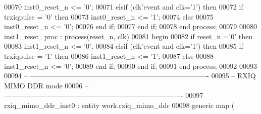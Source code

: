 \begin{DoxyCode}
00070       inst0\_reset\_n <= '0';
00071    \textcolor{keywordflow}{elsif} \textcolor{vhdlchar}{(}\textcolor{vhdlchar}{clk}\textcolor{vhdlchar}{'}\textcolor{vhdlkeyword}{event} \textcolor{keywordflow}{and} \textcolor{vhdlchar}{clk}\textcolor{vhdlchar}{=}\textcolor{vhdlchar}{'}\textcolor{vhdllogic}{}\textcolor{vhdllogic}{1}\textcolor{vhdlchar}{'}\textcolor{vhdlchar}{)} \textcolor{keywordflow}{then} 
00072       \textcolor{keywordflow}{if} \textcolor{vhdlchar}{trxiqpulse} \textcolor{vhdlchar}{=} \textcolor{vhdlchar}{'}\textcolor{vhdllogic}{}\textcolor{vhdllogic}{0}\textcolor{vhdlchar}{'} \textcolor{keywordflow}{then} 
00073          inst0\_reset\_n <= '1';
00074       \textcolor{keywordflow}{else} 
00075          inst0\_reset\_n <= '0';
00076       \textcolor{keywordflow}{end} \textcolor{keywordflow}{if};
00077    \textcolor{keywordflow}{end} \textcolor{keywordflow}{if};
00078 \textcolor{keywordflow}{end} \textcolor{keywordflow}{process};
00079 
00080 inst1\_reset\_proc : \textcolor{keywordflow}{process}(reset_n, clk)
00081 \textcolor{vhdlkeyword}{begin}
00082    \textcolor{keywordflow}{if} \textcolor{vhdlchar}{reset_n} \textcolor{vhdlchar}{=}\textcolor{vhdlchar}{'}\textcolor{vhdllogic}{}\textcolor{vhdllogic}{0}\textcolor{vhdlchar}{'} \textcolor{keywordflow}{then} 
00083       inst1\_reset\_n <= '0';
00084    \textcolor{keywordflow}{elsif} \textcolor{vhdlchar}{(}\textcolor{vhdlchar}{clk}\textcolor{vhdlchar}{'}\textcolor{vhdlkeyword}{event} \textcolor{keywordflow}{and} \textcolor{vhdlchar}{clk}\textcolor{vhdlchar}{=}\textcolor{vhdlchar}{'}\textcolor{vhdllogic}{}\textcolor{vhdllogic}{1}\textcolor{vhdlchar}{'}\textcolor{vhdlchar}{)} \textcolor{keywordflow}{then} 
00085       \textcolor{keywordflow}{if} \textcolor{vhdlchar}{trxiqpulse} \textcolor{vhdlchar}{=} \textcolor{vhdlchar}{'}\textcolor{vhdllogic}{}\textcolor{vhdllogic}{1}\textcolor{vhdlchar}{'} \textcolor{keywordflow}{then} 
00086          inst1\_reset\_n <= '1';
00087       \textcolor{keywordflow}{else} 
00088          inst1\_reset\_n <= '0';
00089       \textcolor{keywordflow}{end} \textcolor{keywordflow}{if};
00090    \textcolor{keywordflow}{end} \textcolor{keywordflow}{if};
00091 \textcolor{keywordflow}{end} \textcolor{keywordflow}{process};
00092 
00093  
00094 \textcolor{keyword}{-- ----------------------------------------------------------------------------}
00095 \textcolor{keyword}{-- RXIQ MIMO DDR mode}
00096 \textcolor{keyword}{-- ----------------------------------------------------------------------------}
00097  rxiq\_mimo\_ddr\_inst0 : \textcolor{keywordflow}{entity} work.rxiq_mimo_ddr
00098    \textcolor{keywordflow}{generic} \textcolor{keywordflow}{map} (

\end{DoxyCode}
